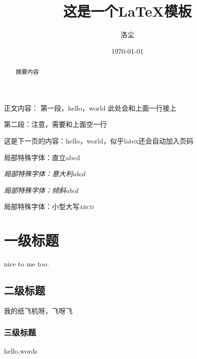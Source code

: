 \documentclass[12pt,a4paper,oneside]{ctexart}
\title{这是一个\LaTeX 模板}
\author{洛尘}
\date{\today}
\begin{document}
    

\maketitle

\tableofcontents

\begin{abstract}
    摘要内容
\end{abstract}

正文内容：
第一段，hello，world
此处会和上面一行接上

第二段：注意，需要和上面空一行

\newpage
这是下一页的内容：hello，world，似乎latex还会自动加入页码

\textup{局部特殊字体：直立abcd}

\textit{局部特殊字体：意大利abcd}

\textsl{局部特殊字体：倾斜abcd}

\textsc{局部特殊字体：小型大写abcd}

\section{一级标题}
nice to me too.
\subsection{二级标题}
我的纸飞机呀，飞呀飞
\subsubsection{三级标题}
hello,words

% 
% 
\end{document}
